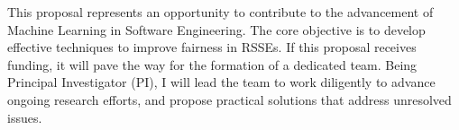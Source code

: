 

This proposal represents an opportunity to contribute to the advancement of Machine Learning in Software Engineering. %
The core objective %
is to develop effective techniques to improve %
fairness in RSSEs. %
If this proposal receives funding, it will pave the way for the formation of a dedicated team. %
Being Principal Investigator (PI), I will lead the team to work diligently to advance ongoing research efforts, and propose practical solutions that address unresolved issues. %














